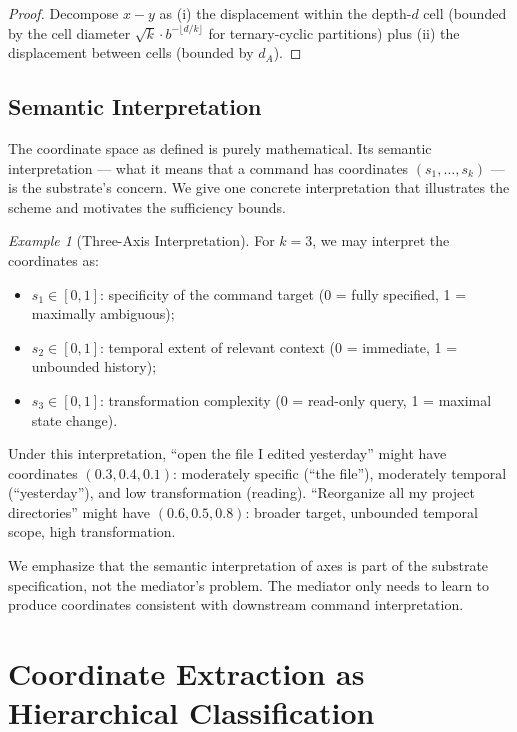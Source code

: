 \documentclass[11pt,a4paper]{article}
\theoremstyle{definition}
\theoremstyle{remark}
\newtheorem{example}[theorem]{Example}
\begin{document}
\begin{proof}
Decompose $x - y$ as (i) the displacement within the depth-$d$ cell (bounded by the cell diameter $\sqrt{k} \cdot b^{-\lfloor d/k \rfloor}$ for ternary-cyclic partitions) plus (ii) the displacement between cells (bounded by $d_A$).
\end{proof}

\subsection{Semantic Interpretation}

The coordinate space as defined is purely mathematical. Its semantic interpretation --- what it means that a command has coordinates $(s_1, \ldots, s_k)$ --- is the substrate's concern. We give one concrete interpretation that illustrates the scheme and motivates the sufficiency bounds.

\begin{example}[Three-Axis Interpretation]
\label{ex:three-axis}
For $k = 3$, we may interpret the coordinates as:
\begin{itemize}
    \item $s_1 \in [0,1]$: specificity of the command target (0 = fully specified, 1 = maximally ambiguous);
    \item $s_2 \in [0,1]$: temporal extent of relevant context (0 = immediate, 1 = unbounded history);
    \item $s_3 \in [0,1]$: transformation complexity (0 = read-only query, 1 = maximal state change).
\end{itemize}
Under this interpretation, ``open the file I edited yesterday'' might have coordinates $(0.3, 0.4, 0.1)$: moderately specific (``the file''), moderately temporal (``yesterday''), and low transformation (reading). ``Reorganize all my project directories'' might have $(0.6, 0.5, 0.8)$: broader target, unbounded temporal scope, high transformation.
\end{example}

We emphasize that the semantic interpretation of axes is part of the substrate specification, not the mediator's problem. The mediator only needs to learn to produce coordinates consistent with downstream command interpretation.

\section{Coordinate Extraction as Hierarchical Classification}
\label{sec:extraction}
\end{document}
